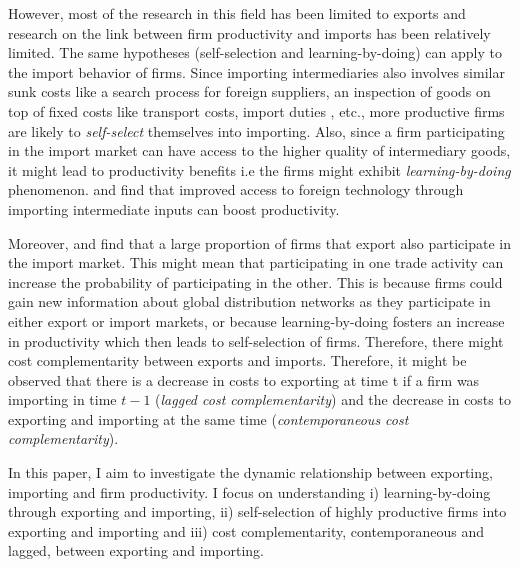 \documentclass[12pt]{article}
\begin{document}



However, most of the research in this field has been limited to
exports and research on the link between firm productivity and imports has been relatively limited. The same hypotheses (self-selection and learning-by-doing) can  apply
to the import behavior of firms. Since importing intermediaries also
involves  
similar sunk costs like  a search process for foreign suppliers,
an inspection of goods on top of fixed costs like  transport costs, import duties
, etc., more productive firms are likely to \textit{self-select} themselves
into importing. Also, since a firm
participating in the import market can have access to the higher quality
of intermediary goods, it might lead to productivity benefits
i.e the firms might exhibit \textit{learning-by-doing} phenomenon. 
\textcite{topalova2011trade}  and \textcite{halpern2011imported}
find that improved access to foreign technology through importing
intermediate inputs can boost productivity. 

Moreover, \textcite{muuls2009imports} and \textcite{aristei2013firms} find that
a large proportion of firms that export also participate in the import
market. This might mean that participating in one trade activity can increase the probability of
participating in the other. This is
because  firms could gain new information about global distribution
networks as they participate in either export or import markets, or
because learning-by-doing fosters an increase in productivity which
then leads to self-selection of firms. Therefore, there might cost
complementarity between exports and imports. Therefore, it might be
observed that there is a decrease in costs to
exporting at time t if a firm was importing in time $t-1$
(\textit{lagged cost complementarity}) and the decrease in costs 
to exporting and importing at the same time 
(\textit{contemporaneous cost complementarity}).  

In this paper, I aim to investigate the dynamic relationship between
exporting, importing and firm productivity. I focus on understanding 
i) learning-by-doing through exporting and importing, ii)
self-selection of highly productive firms into exporting and importing
and iii) cost
complementarity, contemporaneous and lagged, between exporting and
importing. 
\end{document}
